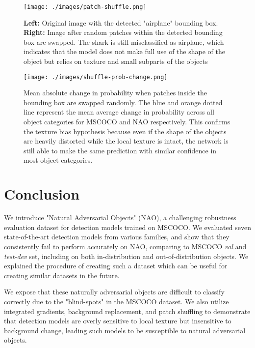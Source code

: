 \documentclass[final]{cvpr}
\begin{document}
\begin{figure}[t]
\begin{center}
   \texttt{[image: ./images/patch-shuffle.png]}
\end{center}
   \caption{\textbf{Left:} Original image with the detected "airplane" bounding box. \textbf{Right:} Image after random patches within the detected bounding box are swapped. The shark is still misclassified as airplane, which indicates that the model does not make full use of the shape of the object but relies on texture and small subparts of the objects}
\label{fig:long}
\label{fig:onecol}
\label{fig:patch_shuffle_sample}
\end{figure}

\begin{figure}[t]
\begin{center}
   \texttt{[image: ./images/shuffle-prob-change.png]}
\end{center}
   \caption{Mean absolute change in probability when patches inside the bounding box are swapped randomly. The blue and orange dotted line represent the mean average change in probability across all object categories for MSCOCO and NAO respectively. This confirms the texture bias hypothesis because even if the shape of the objects are heavily distorted while the local texture is intact, the network is still able to make the same prediction with similar confidence in most object categories.}
\label{fig:long}
\label{fig:onecol}
\label{fig:patch_shuffle_results}
\end{figure}








\section{Conclusion}

We introduce "Natural Adversarial Objects" (NAO), a challenging robustness evaluation dataset for detection models trained on MSCOCO. We evaluated seven state-of-the-art detection models from various families, and show that they consistently fail to perform accurately on NAO, comparing to MSCOCO \textit{val} and \textit{test-dev} set, including on both in-distribution and out-of-distribution objects. We explained the procedure of creating such a dataset which can be useful for creating similar datasets in the future.

We expose that these naturally adversarial objects are difficult to classify correctly due to the "blind-spots" in the MSCOCO dataset. We also utilize integrated gradients, background replacement, and patch shuffling to demonstrate that detection models are overly sensitive to local texture but insensitive to background change, leading such models to be susceptible to natural adversarial objects.



{\small


}
\end{document}
